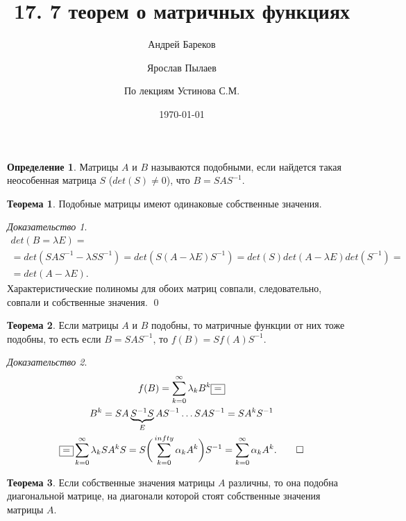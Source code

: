 \documentclass[a4paper,11pt]{article}
\title{17. 7 теорем о матричных функциях}
\author{Андрей Бареков \and Ярослав Пылаев \and По лекциям Устинова С.М.}
\date{\today}
\theoremstyle{definition}
\newtheorem{definition}{Определение}
\newtheorem{theorem}{Теорема}
\theoremstyle{remark}
\newtheorem*{evidence}{Доказательство}
\begin{document}
\maketitle
\newpage

\begin{definition}
  Матрицы $A$ и $B$ называются подобными, если найдется такая неособенная матрица $S$ ($det(S)\ne 0$), что
  $B=SAS^{-1}$.
\end{definition}
\begin{theorem}
  Подобные матрицы имеют одинаковые собственные значения.
\end{theorem}
\begin{evidence}
  \begin{gather*}
    det(B=\lambda E) = \\
    = det(SAS^{-1}-\lambda SS^{-1}) = det(S(A-\lambda E)S^{-1}) = det(S) det(A-\lambda E)det(S^{-1}) = \\
    = det(A-\lambda E).
  \end{gather*}
  Характеристические полиномы для обоих матриц совпали, следовательно, совпали и собственные значения.     \qed
\end{evidence}
\begin{theorem}
  Если матрицы $A$ и $B$ подобны, то матричные функции от них тоже подобны, то есть если $B=SAS^{-1}$, то $f(B)=Sf(A)S^{-1}$.
\end{theorem}
\begin{evidence}
  \begin{gather*}
    f(B) = \sum_{k=0}^{\infty}\lambda_kB^k \boxed{=} \\
    B^k = SA\underbrace{S^{-1}S}_{E}AS^{-1} \dots SAS^{-1} = SA^kS^{-1} \\
    \boxed{=} \sum_{k=0}^{\infty}\lambda_kSA^kS = S\bigg(\sum_{k=0}^{infty}\alpha_kA^k\bigg)S^{-1} = \sum_{k=0}^{\infty}\alpha_kA^k.     \qed %
  \end{gather*}
\end{evidence}
\begin{theorem}
  Если собственные значения матрицы $A$ различны, то она подобна диагональной матрице, на диагонали которой стоят собственные значения матрицы $A$.
\end{theorem}
\end{document}
